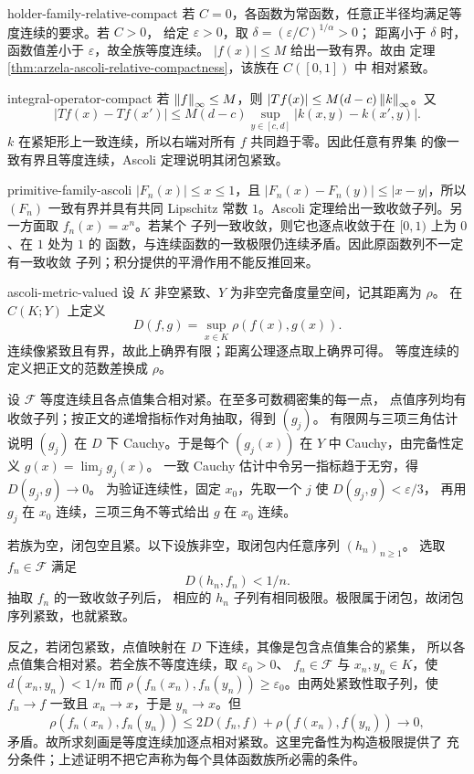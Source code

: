 \begin{solution}{holder-family-relative-compact}
若 $C=0$，各函数为常函数，任意正半径均满足等度连续的要求。若 $C>0$，
给定 $\varepsilon>0$，取 $\delta=(\varepsilon/C)^{1/\alpha}>0$；
距离小于 $\delta$ 时，函数值差小于 $\varepsilon$，故全族等度连续。
$|f(x)|\le M$ 给出一致有界。故由
定理 \ref{thm:arzela-ascoli-relative-compactness}，该族在 $C([0,1])$ 中
相对紧致。
\end{solution}

\begin{solution}{integral-operator-compact}
若 $\left\lVert f\right\rVert_\infty\le M$，则
$|Tf(x)|\le M(d-c)\left\lVert k\right\rVert_\infty$。又
\[
 |Tf(x)-Tf(x')|
 \le M(d-c)\sup_{y\in[c,d]}|k(x,y)-k(x',y)|.
\]
$k$ 在紧矩形上一致连续，所以右端对所有 $f$ 共同趋于零。因此任意有界集
的像一致有界且等度连续，Ascoli 定理说明其闭包紧致。
\end{solution}

\begin{solution}{primitive-family-ascoli}
$|F_n(x)|\le x\le1$，且
$|F_n(x)-F_n(y)|\le|x-y|$，所以 $(F_n)$ 一致有界并具有共同 Lipschitz
常数 $1$。Ascoli 定理给出一致收敛子列。另一方面取 $f_n(x)=x^n$。若某个
子列一致收敛，则它也逐点收敛于在 $[0,1)$ 上为 $0$、在 $1$ 处为 $1$ 的
函数，与连续函数的一致极限仍连续矛盾。因此原函数列不一定有一致收敛
子列；积分提供的平滑作用不能反推回来。
\end{solution}

\begin{solution}{ascoli-metric-valued}
设 $K$ 非空紧致、$Y$ 为非空完备度量空间，记其距离为 $\rho$。
在 $C(K;Y)$ 上定义
\[
 D(f,g)=\sup_{x\in K}\rho(f(x),g(x)).
\]
连续像紧致且有界，故此上确界有限；距离公理逐点取上确界可得。
等度连续的定义把正文的范数差换成 $\rho$。

设 $\mathcal F$ 等度连续且各点值集合相对紧。在至多可数稠密集的每一点，
点值序列均有收敛子列；按正文的递增指标作对角抽取，得到 $(g_j)$。
有限网与三项三角估计说明 $(g_j)$ 在 $D$ 下 Cauchy。于是每个
$(g_j(x))$ 在 $Y$ 中 Cauchy，由完备性定义 $g(x)=\lim_jg_j(x)$。
一致 Cauchy 估计中令另一指标趋于无穷，得 $D(g_j,g)\to0$。
为验证连续性，固定 $x_0$，先取一个 $j$ 使 $D(g_j,g)<\varepsilon/3$，
再用 $g_j$ 在 $x_0$ 连续，三项三角不等式给出 $g$ 在 $x_0$ 连续。

若族为空，闭包空且紧。以下设族非空，取闭包内任意序列 $(h_n)_{n\ge1}$。
选取 $f_n\in\mathcal F$ 满足
\[
 D(h_n,f_n)<1/n.
\]
抽取 $f_n$ 的一致收敛子列后，
相应的 $h_n$ 子列有相同极限。极限属于闭包，故闭包序列紧致，也就紧致。

反之，若闭包紧致，点值映射在 $D$ 下连续，其像是包含点值集合的紧集，
所以各点值集合相对紧。若全族不等度连续，取 $\varepsilon_0>0$、
$f_n\in\mathcal F$ 与 $x_n,y_n\in K$，使 $d(x_n,y_n)<1/n$ 而
$\rho(f_n(x_n),f_n(y_n))\ge\varepsilon_0$。由两处紧致性取子列，使
$f_n\to f$ 一致且 $x_n\to x$，于是 $y_n\to x$。但
\[
 \rho(f_n(x_n),f_n(y_n))
 \le2D(f_n,f)+\rho(f(x_n),f(y_n))\longrightarrow0,
\]
矛盾。故所求刻画是等度连续加逐点相对紧致。这里完备性为构造极限提供了
充分条件；上述证明不把它声称为每个具体函数族所必需的条件。
\end{solution}
